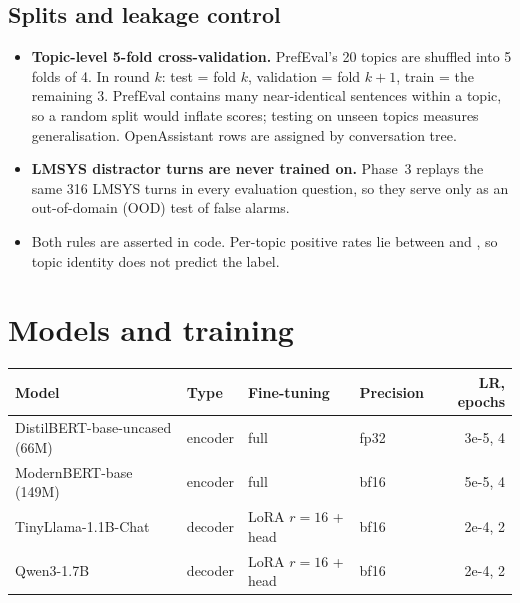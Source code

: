 \documentclass[11pt,a4paper]{article}
\begin{document}
\begin{table}[H]
\centering\small

\caption{Agreement between pseudo-labels and the human audit, before and after refinement. ``After'' is measured on the same
audited rows that motivated the fixes, so it is somewhat optimistic. The audited rows themselves use the human label in training.}
\label{tab:audit}
\end{table}

\subsection{Splits and leakage control}
\begin{itemize}
  \item \textbf{Topic-level 5-fold cross-validation.} PrefEval's 20 topics are shuffled into 5 folds of 4. In round $k$: test = fold $k$,
        validation = fold $k{+}1$, train = the remaining 3. PrefEval contains many near-identical sentences within a topic, so a random split would
        inflate scores; testing on unseen topics measures generalisation. OpenAssistant rows are assigned by conversation tree.
  \item \textbf{LMSYS distractor turns are never trained on.} Phase~3 replays the same 316 LMSYS turns in every evaluation question, so
        they serve only as an out-of-domain (OOD) test of false alarms.
  \item Both rules are asserted in code. Per-topic positive rates lie between \pTopicRateLo{} and \pTopicRateHi, so topic identity
        does not predict the label.
\end{itemize}

\section{Models and training}

\begin{center}\small
\begin{tabular}{llllr}
\toprule
Model & Type & Fine-tuning & Precision & LR, epochs \\
\midrule
DistilBERT-base-uncased (66M) & encoder & full & fp32 & 3e-5, 4 \\
ModernBERT-base (149M) & encoder & full & bf16 & 5e-5, 4 \\
TinyLlama-1.1B-Chat & decoder & LoRA $r{=}16$ + head & bf16 & 2e-4, 2 \\
Qwen3-1.7B & decoder & LoRA $r{=}16$ + head & bf16 & 2e-4, 2 \\
\bottomrule
\end{tabular}
\end{center}
\end{document}
